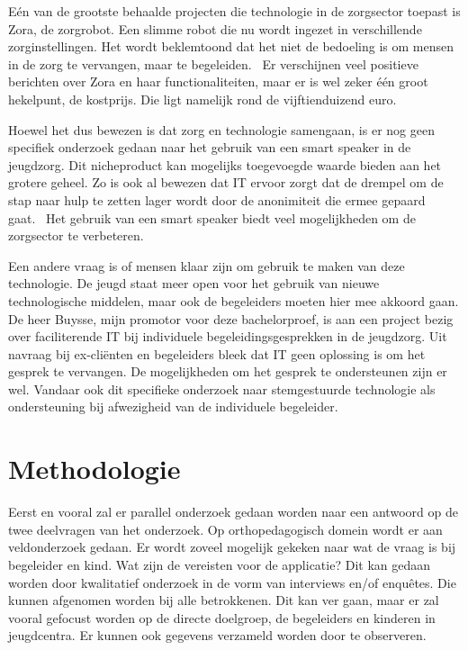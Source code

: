 Eén van de grootste behaalde projecten die technologie in de zorgsector toepast is Zora, de zorgrobot. Een slimme robot die nu wordt ingezet in verschillende zorginstellingen. Het wordt beklemtoond dat het niet de bedoeling is om mensen in de zorg te vervangen, maar te begeleiden.~\autocite{Grypdonck2015} Er verschijnen veel positieve berichten over Zora en haar functionaliteiten, maar er is wel zeker één groot hekelpunt, de kostprijs. Die ligt namelijk rond de vijftienduizend euro.~\autocite{Jongejan2016}

Hoewel het dus bewezen is dat zorg en technologie samengaan, is er nog geen specifiek onderzoek gedaan naar het gebruik van een smart speaker in de jeugdzorg. Dit nicheproduct kan mogelijks toegevoegde waarde bieden aan het grotere geheel. Zo is ook al bewezen dat IT ervoor zorgt dat de drempel om de stap naar hulp te zetten lager wordt door de anonimiteit die ermee gepaard gaat.~\autocite{Stil2016} Het gebruik van een smart speaker biedt veel mogelijkheden om de zorgsector te verbeteren.

Een andere vraag is of mensen klaar zijn om gebruik te maken van deze technologie. De jeugd staat meer open voor het gebruik van nieuwe technologische middelen, maar ook de begeleiders moeten hier mee akkoord gaan. De heer Buysse, mijn promotor voor deze bachelorproef, is aan een project bezig over faciliterende IT bij individuele begeleidingsgesprekken in de jeugdzorg. Uit navraag bij ex-cliënten en begeleiders bleek dat IT geen oplossing is om het gesprek te vervangen. De mogelijkheden om het gesprek te ondersteunen zijn er wel. Vandaar ook dit specifieke onderzoek naar stemgestuurde technologie als ondersteuning bij afwezigheid van de individuele begeleider.


\section{Methodologie}
\label{sec:methodologie}
Eerst en vooral zal er parallel onderzoek gedaan worden naar een antwoord op de twee deelvragen van het onderzoek.
Op orthopedagogisch domein wordt er aan veldonderzoek gedaan. Er wordt zoveel mogelijk gekeken naar wat de vraag is bij begeleider en kind. Wat zijn de vereisten voor de applicatie? Dit kan gedaan worden door kwalitatief onderzoek in de vorm van interviews en/of enquêtes. Die kunnen afgenomen worden bij alle betrokkenen. Dit kan ver gaan, maar er zal vooral gefocust worden op de directe doelgroep, de begeleiders en kinderen in jeugdcentra. Er kunnen ook gegevens verzameld worden door te observeren.

